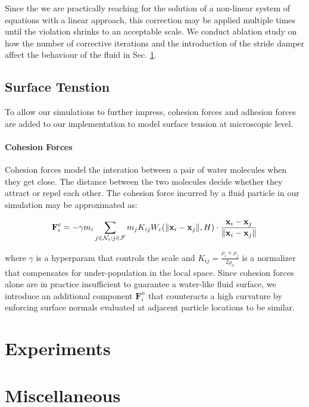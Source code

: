 \documentclass[
	11pt, 
	DIV10,
	ngerman,
	a4paper, 
	oneside, 
	headings=normal, 
	captions=tableheading,
	final, 
	numbers=noenddot
]{scrartcl}
\DeclarePairedDelimiter{\norm}{\lVert}{\rVert}
\begin{document}
Since the we are practically reaching for the solution of a non-linear system of equations with a linear approach, this correction may be applied multiple times until the violation shrinks to an acceptable scale. We conduct ablation study on how the number of corrective iterations and the introduction of the stride damper affect the behaviour of the fluid in Sec. \ref{sec4}.

\subsection{Surface Tenstion}

To allow our simulations to further impress, cohesion forces and adhesion forces are added to our implementation to model surface tension at microscopic level.

\paragraph{Cohesion Forces}

Cohesion forces model the interation between a pair of water molecules when they get close. The distance between the two molecules decide whether they attract or repel each other. The cohesion force incurred by a fluid particle in our simulation may be approximated as:

\begin{equation}
	\label{eq25}
	\mathbf{F}_{i}^{c} = - \gamma m_i \sum_{j \in \mathcal{N}_{i}:j \in \mathcal{F}} m_j K_{ij} W_{c}(\norm{\mathbf{x}_{i} - \mathbf{x}_{j}}, H) \cdot \frac{\mathbf{x}_{i} - \mathbf{x}_{j}}{\norm{\mathbf{x}_{i} - \mathbf{x}_{j}}}
\end{equation}

where $ \gamma $ is a hyperparam that controls the scale and $ K_{ij} = \frac{\rho_{i} + \rho_{j}}{2\rho_{0}} $ is a normalizer that compensates for under-population in the local space. Since cohesion forces alone are in practice insufficient to guarantee a water-like fluid surface, we introduce an additional component $ \mathbf{F}_{i}^{n} $ that counteracts a high curvature by enforcing surface normals evaluated at adjacent particle locations to be similar.

\section{Experiments}
\label{sec4}
\section{Miscellaneous}
\label{sec5}



\end{document}
